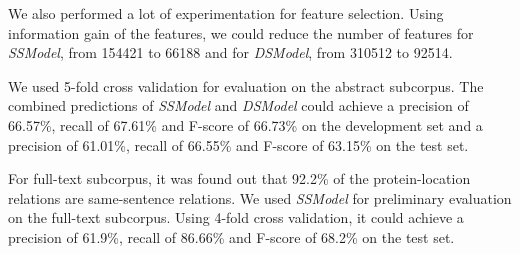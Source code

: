 We also performed a lot of experimentation for feature selection. Using information gain of the features, we could reduce the number of features for \textit{SSModel}, from 154421 to 66188 and for \textit{DSModel}, from 310512 to 92514.

We used 5-fold cross validation for evaluation on the abstract subcorpus. The combined predictions of \textit{SSModel} and \textit{DSModel} could achieve a precision of 66.57\%, recall of 67.61\% and F-score of 66.73\% on the development set and a precision of 61.01\%, recall of 66.55\% and F-score of 63.15\% on the test set.

For full-text subcorpus, it was found out that 92.2\% of the protein-location relations are same-sentence relations. We used \textit{SSModel} for preliminary evaluation on the full-text subcorpus. Using 4-fold cross validation, it could achieve a precision of 61.9\%, recall of 86.66\% and F-score of 68.2\% on the test set.
